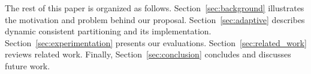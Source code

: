 %
%






The rest of this paper is organized as
follows. Section~\ref{sec:background} illustrates the motivation and
problem behind our proposal.  Section~\ref{sec:adaptive} describes
dynamic consistent partitioning and its
implementation. Section~\ref{sec:experimentation} presents our
evaluations.  Section~\ref{sec:related_work} reviews related
work. Finally, Section~\ref{sec:conclusion} concludes and discusses
future work.
  

